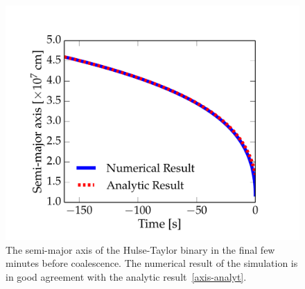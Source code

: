 \documentclass[preprint2]{aastex}
\begin{document}
\begin{figure}[t!]
\vspace{-0.24cm}
\centering
\hspace*{-1cm}\includegraphics[width=1.2\textwidth]{inspiral_figs/inspiral_axs.pdf}
\caption{The semi-major axis of the Hulse-Taylor binary in the final few minutes before coalescence. The numerical result of the simulation is in good agreement with the analytic result~\eqref{axis-analyt}.}
\label{inspiral-axis}
\end{figure}
\end{document}
